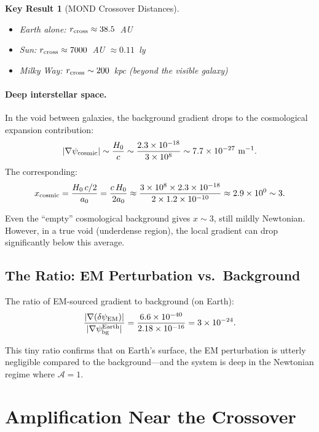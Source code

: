 \documentclass[aps,prd,twocolumn,superscriptaddress,nofootinbib]{revtex4-2}
\newcommand{\ee}[1]{\times 10^{#1}}
\newtheorem{result}{Key Result}
\begin{document}
\begin{result}[MOND Crossover Distances]
\begin{itemize}[nosep]
\item Earth alone: $r_{\rm cross} \approx 38.5$~AU
\item Sun: $r_{\rm cross} \approx 7000$~AU $\approx 0.11$~ly
\item Milky Way: $r_{\rm cross} \sim 200$~kpc (beyond the visible galaxy)
\end{itemize}
\end{result}

\paragraph{Deep interstellar space.}
In the void between galaxies, the background gradient drops to the
cosmological expansion contribution:
\begin{equation}
|\nabla\psi_{\rm cosmic}| \sim \frac{H_0}{c} \sim \frac{2.3\ee{-18}}{3\ee{8}}
\sim 7.7\ee{-27}~\text{m}^{-1}.
\end{equation}
The corresponding:
\begin{equation}
x_{\rm cosmic} = \frac{H_0\,c/2}{a_0} = \frac{c\,H_0}{2a_0}
\approx \frac{3\ee{8}\times 2.3\ee{-18}}{2\times 1.2\ee{-10}}
\approx 2.9\ee{0} \sim 3.
\end{equation}

Even the ``empty'' cosmological background gives $x \sim 3$, still
mildly Newtonian.  However, in a true void (underdense region), the
local gradient can drop significantly below this average.

\subsection{The Ratio: EM Perturbation vs.\ Background}

The ratio of EM-sourced gradient to background (on Earth):
\begin{equation}
\frac{|\nabla(\delta\psi_{\rm EM})|}{|\nabla\psi_{\rm bg}^{\rm Earth}|}
= \frac{6.6\ee{-40}}{2.18\ee{-16}} = 3\ee{-24}.
\end{equation}

This tiny ratio confirms that on Earth's surface, the EM perturbation
is utterly negligible compared to the background---and the system is
deep in the Newtonian regime where $\mathcal{A} = 1$.


\section{Amplification Near the Crossover}\label{sec:amplification}
\end{document}
